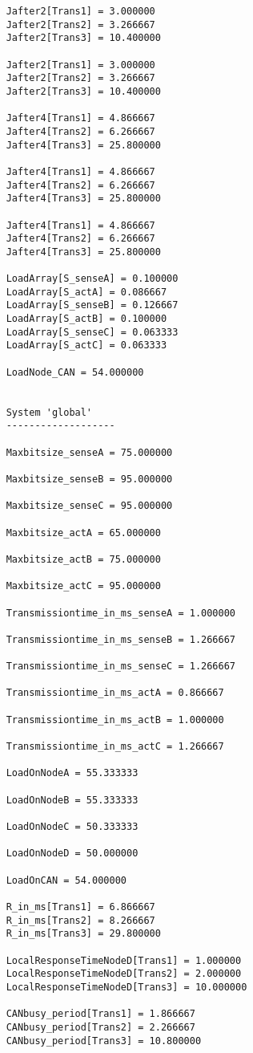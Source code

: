 \begin{lstlisting}
    Jafter2[Trans1] = 3.000000
    Jafter2[Trans2] = 3.266667
    Jafter2[Trans3] = 10.400000
    
    Jafter2[Trans1] = 3.000000
    Jafter2[Trans2] = 3.266667
    Jafter2[Trans3] = 10.400000
    
    Jafter4[Trans1] = 4.866667
    Jafter4[Trans2] = 6.266667
    Jafter4[Trans3] = 25.800000
    
    Jafter4[Trans1] = 4.866667
    Jafter4[Trans2] = 6.266667
    Jafter4[Trans3] = 25.800000
    
    Jafter4[Trans1] = 4.866667
    Jafter4[Trans2] = 6.266667
    Jafter4[Trans3] = 25.800000
    
    LoadArray[S_senseA] = 0.100000
    LoadArray[S_actA] = 0.086667
    LoadArray[S_senseB] = 0.126667
    LoadArray[S_actB] = 0.100000
    LoadArray[S_senseC] = 0.063333
    LoadArray[S_actC] = 0.063333
    
    LoadNode_CAN = 54.000000
    
    
    System 'global'
    -------------------
    
    Maxbitsize_senseA = 75.000000
    
    Maxbitsize_senseB = 95.000000
    
    Maxbitsize_senseC = 95.000000
    
    Maxbitsize_actA = 65.000000
    
    Maxbitsize_actB = 75.000000
    
    Maxbitsize_actC = 95.000000
    
    Transmissiontime_in_ms_senseA = 1.000000
    
    Transmissiontime_in_ms_senseB = 1.266667
    
    Transmissiontime_in_ms_senseC = 1.266667
    
    Transmissiontime_in_ms_actA = 0.866667
    
    Transmissiontime_in_ms_actB = 1.000000
    
    Transmissiontime_in_ms_actC = 1.266667
    
    LoadOnNodeA = 55.333333
    
    LoadOnNodeB = 55.333333
    
    LoadOnNodeC = 50.333333
    
    LoadOnNodeD = 50.000000
    
    LoadOnCAN = 54.000000
    
    R_in_ms[Trans1] = 6.866667
    R_in_ms[Trans2] = 8.266667
    R_in_ms[Trans3] = 29.800000
    
    LocalResponseTimeNodeD[Trans1] = 1.000000
    LocalResponseTimeNodeD[Trans2] = 2.000000
    LocalResponseTimeNodeD[Trans3] = 10.000000
    
    CANbusy_period[Trans1] = 1.866667
    CANbusy_period[Trans2] = 2.266667
    CANbusy_period[Trans3] = 10.800000
    

\end{lstlisting}
